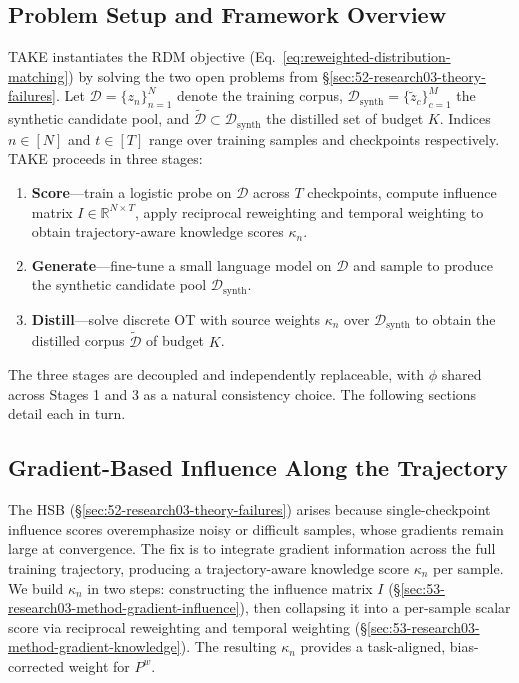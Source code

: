 \documentclass[12pt, a4paper, twoside]{book}
\numberwithin{equation}{chapter}
\theoremstyle{plain}
\theoremstyle{definition}
\theoremstyle{remark}
\newenvironment{foldable}{}{}
\begin{document}
\subsection{Problem Setup and Framework Overview} \label{sec:53-research03-method-setup}
\begin{foldable} TAKE instantiates the \ac{RDM} objective (Eq.~\ref{eq:reweighted-distribution-matching}) by solving the two open problems from \S\ref{sec:52-research03-theory-failures}.
  Let $\mathcal{D} = \{z_n\}_{n=1}^{N}$ denote the training corpus, $\mathcal{D}_\text{synth} = \{\tilde{z}_c\}_{c=1}^{M}$ the synthetic candidate pool, and $\tilde{\mathcal{D}} \subset \mathcal{D}_\text{synth}$ the distilled set of budget $K$.
  Indices $n \in [N]$ and $t \in [T]$ range over training samples and checkpoints respectively.
  TAKE proceeds in three stages:
  \begin{enumerate}
    \item \textbf{Score}---train a logistic probe on $\mathcal{D}$ across $T$ checkpoints, compute influence matrix $I \in \mathbb{R}^{N \times T}$, apply reciprocal reweighting and temporal weighting to obtain trajectory-aware knowledge scores $\kappa_n$.
    \item \textbf{Generate}---fine-tune a small language model on $\mathcal{D}$ and sample to produce the synthetic candidate pool $\mathcal{D}_\text{synth}$.
    \item \textbf{Distill}---solve discrete \ac{OT} with source weights $\kappa_n$ over $\mathcal{D}_\text{synth}$ to obtain the distilled corpus $\tilde{\mathcal{D}}$ of budget $K$.
  \end{enumerate}
  The three stages are decoupled and independently replaceable, with $\phi$ shared across Stages 1 and 3 as a natural consistency choice. The following sections detail each in turn.
\end{foldable}

\subsection{Gradient-Based Influence Along the Trajectory} \label{sec:53-research03-method-gradient}
\begin{foldable} The \acl{HSB} (\S\ref{sec:52-research03-theory-failures}) arises because single-checkpoint influence scores overemphasize noisy or difficult samples, whose gradients remain large at convergence.
  The fix is to integrate gradient information across the full training trajectory, producing a trajectory-aware knowledge score $\kappa_n$ per sample.
  We build $\kappa_n$ in two steps: constructing the influence matrix $I$ (\S\ref{sec:53-research03-method-gradient-influence}), then collapsing it into a per-sample scalar score via reciprocal reweighting and temporal weighting (\S\ref{sec:53-research03-method-gradient-knowledge}).
  The resulting $\kappa_n$ provides a task-aligned, bias-corrected weight for $P^w$.
\end{foldable}
\end{document}
